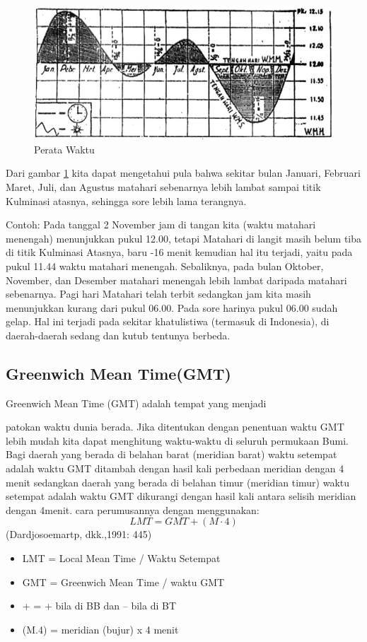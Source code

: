 	\begin{figure}[ht]
	\centerline{\includegraphics[width=1\textwidth]{figures/sejarahwaktu_peratawaktu}}
	\caption{Perata Waktu}
	\label{sejarahwaktu_Capture}
	\end{figure}

 Dari gambar \ref{sejarahwaktu_Capture} kita dapat mengetahui pula bahwa sekitar bulan Januari, Februari
 Maret, Juli, dan Agustus matahari sebenarnya lebih lambat sampai titik Kulminasi atasnya,
 sehingga sore lebih lama terangnya.
 
	Contoh: Pada tanggal 2 November jam di tangan kita (waktu matahari menengah) 
	menunjukkan pukul 12.00, tetapi Matahari di langit masih belum tiba di titik Kulminasi 
	Atasnya, baru -16 menit kemudian hal itu terjadi, yaitu pada pukul 11.44 waktu matahari 
	menengah. Sebaliknya, pada bulan Oktober, November, dan Desember matahari menengah 
	lebih lambat daripada matahari sebenarnya. Pagi hari Matahari telah terbit sedangkan 
	jam kita masih menunjukkan kurang dari pukul 06.00. Pada sore harinya pukul 06.00 sudah
	gelap. Hal ini terjadi pada sekitar khatulistiwa (termasuk di Indonesia), 
	di daerah-daerah sedang dan kutub tentunya berbeda.
	

\subsection{Greenwich Mean Time(GMT)}
Greenwich Mean Time (GMT) adalah tempat yang menjadi

 patokan waktu dunia berada. Jika ditentukan dengan penentuan waktu GMT lebih mudah kita
 dapat menghitung waktu-waktu di seluruh permukaan Bumi. Bagi daerah yang
 berada di belahan barat (meridian barat) waktu setempat adalah waktu GMT
 ditambah dengan hasil kali perbedaan meridian dengan 4 menit sedangkan daerah
 yang berada di belahan timur (meridian timur) waktu setempat adalah waktu GMT
 dikurangi dengan hasil kali antara selisih meridian dengan 4menit. 
 cara perumusannya dengan menggunakan:
 \begin{equation}
					LMT = GMT +(M \cdot 4)
\end{equation}
			(Dardjosoemartp, dkk.,1991: 445)
\begin{itemize}		
\item LMT  = Local Mean Time / Waktu Setempat 
\item GMT  = Greenwich Mean Time / waktu GMT
\item +	 = + bila di BB dan – bila di BT 
\item (M.4) = meridian (bujur) x 4 menit
\end{itemize}


